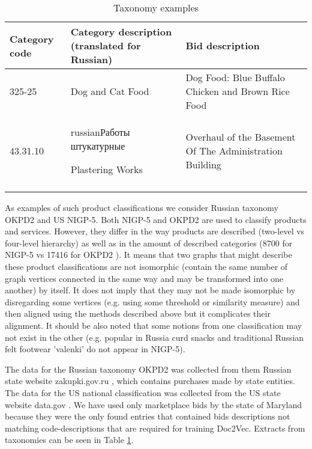 \documentclass[conference]{IEEEtran}
\begin{document}
\begin{center}
\begin{table}[!htbp]
\caption{Taxonomy examples}
\begin{tabular}{p{1.5cm}|p{3cm}|p{3cm}}
  Category code & Category description \newline (translated for Russian) & Bid description\\
  \hline
  \hline
 325-25 & Dog and Cat Food & Dog Food: Blue Buffalo Chicken and Brown Rice Food\\
  43.31.10 & \begin{otherlanguage*}{russian}Работы штукатурные\end{otherlanguage*} \newline Plastering Works & Overhaul of the Basement Of The Administration Building\\
\label{table-taxonomies}
\end{tabular}
\end{table}
\end{center}

As examples of such product classifications we consider Russian taxonomy OKPD2 and US NIGP-5.
Both NIGP-5 and OKPD2 are used to classify products and services. However, they differ in the way products are described (two-level vs four-level hierarchy) as well as in the amount of described categories (8700 for NIGP-5 \cite{wiki-nigp} vs 17416 for OKPD2 \cite{wiki-okpd}). It means that two graphs that might describe these product classifications are not isomorphic (contain the same number of graph vertices connected in the same way and may be transformed into one another) by itself.  It does not imply that they may not be made isomorphic by disregarding some vertices (e.g. using some threshold or similarity measure) and then aligned using the methods described above but it complicates their alignment. It should be also noted that some notions from one classification may not exist in the other (e.g. popular in Russia curd snacks and traditional Russian felt footwear 'valenki' do not appear in NIGP-5).

The data for the Russian taxonomy OKPD2 was collected from them Russian state website zakupki.gov.ru \cite{gos-zakupki}, which contains purchases made by state entities.
The data for the US national classification was collected from the US state website data.gov \cite{data-gov}. We have used only marketplace bids by the state of Maryland because they were the only found entries that contained bids descriptions not matching code-descriptions that are required for training Doc2Vec. Extracts from taxonomies can be seen in Table \ref{table-taxonomies}.
\end{document}
